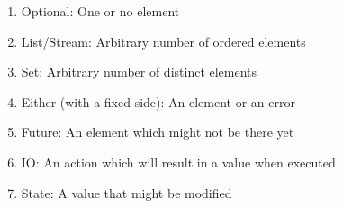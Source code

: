 \begin{enumerate}
  \item Optional: One or no element
  \item List/Stream: Arbitrary number of ordered elements
  \item Set: Arbitrary number of distinct elements
  \item Either (with a fixed side): An element or an error
  \item Future: An element which might not be there yet
  \item IO: An action which will result in a value when executed
  \item State: A value that might be modified
\end{enumerate}
